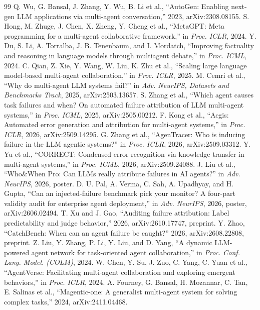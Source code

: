 \documentclass[conference]{IEEEtran}
\begin{document}
\begin{thebibliography}{99}
 Q. Wu, G. Bansal, J. Zhang, Y. Wu, B. Li et al., ``AutoGen: Enabling next-gen LLM applications via multi-agent conversation,'' 2023, arXiv:2308.08155.
 S. Hong, M. Zhuge, J. Chen, X. Zheng, Y. Cheng et al., ``MetaGPT: Meta programming for a multi-agent collaborative framework,'' in \emph{Proc. ICLR}, 2024.
 Y. Du, S. Li, A. Torralba, J. B. Tenenbaum, and I. Mordatch, ``Improving factuality and reasoning in language models through multiagent debate,'' in \emph{Proc. ICML}, 2024.
 C. Qian, Z. Xie, Y. Wang, W. Liu, K. Zhu et al., ``Scaling large language model-based multi-agent collaboration,'' in \emph{Proc. ICLR}, 2025.
 M. Cemri et al., ``Why do multi-agent LLM systems fail?'' in \emph{Adv. NeurIPS, Datasets and Benchmarks Track}, 2025, arXiv:2503.13657.
 S. Zhang et al., ``Which agent causes task failures and when? On automated failure attribution of LLM multi-agent systems,'' in \emph{Proc. ICML}, 2025, arXiv:2505.00212.
 F. Kong et al., ``Aegis: Automated error generation and attribution for multi-agent systems,'' in \emph{Proc. ICLR}, 2026, arXiv:2509.14295.
 G. Zhang et al., ``AgenTracer: Who is inducing failure in the LLM agentic systems?'' in \emph{Proc. ICLR}, 2026, arXiv:2509.03312.
 Y. Yu et al., ``CORRECT: Condensed error recognition via knowledge transfer in multi-agent systems,'' in \emph{Proc. ICML}, 2026, arXiv:2509.24088.
 J. Liu et al., ``Who\&When Pro: Can LLMs really attribute failures in AI agents?'' in \emph{Adv. NeurIPS}, 2026, poster.
 D. U. Pal, A. Verma, C. Sah, A. Upadhyay, and H. Gupta, ``Can an injected-failure benchmark pick your monitor? A four-part validity audit for enterprise agent deployment,'' in \emph{Adv. NeurIPS}, 2026, poster, arXiv:2606.02494.
 T. Xu and J. Gao, ``Auditing failure attribution: Label predictability and judge behavior,'' 2026, arXiv:2610.17747, preprint.
 Y. Zhao, ``CatchBench: When can an agent failure be caught?'' 2026, arXiv:2608.22808, preprint.
 Z. Liu, Y. Zhang, P. Li, Y. Liu, and D. Yang, ``A dynamic LLM-powered agent network for task-oriented agent collaboration,'' in \emph{Proc. Conf. Lang. Model. (COLM)}, 2024.
 W. Chen, Y. Su, J. Zuo, C. Yang, C. Yuan et al., ``AgentVerse: Facilitating multi-agent collaboration and exploring emergent behaviors,'' in \emph{Proc. ICLR}, 2024.
 A. Fourney, G. Bansal, H. Mozannar, C. Tan, E. Salinas et al., ``Magentic-one: A generalist multi-agent system for solving complex tasks,'' 2024, arXiv:2411.04468.

\end{thebibliography}
\end{document}
